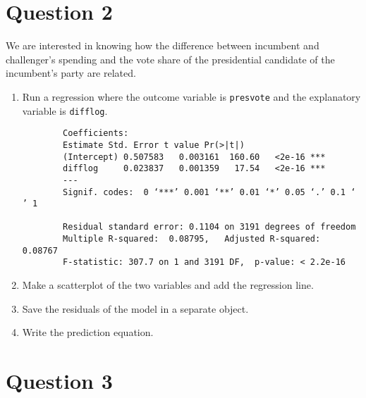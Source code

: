 \documentclass[12pt,letterpaper]{article}
\begin{document}
\section*{Question 2}
\noindent We are interested in knowing how the difference between incumbent and challenger's spending and the vote share of the presidential candidate of the incumbent's party are related.	\vspace{.25cm}
	\begin{enumerate}
		\item Run a regression where the outcome variable is \texttt{presvote} and the explanatory variable is \texttt{difflog}.	\vspace{1cm}
		
		\begin{verbatim}
		Coefficients:
		Estimate Std. Error t value Pr(>|t|)    
		(Intercept) 0.507583   0.003161  160.60   <2e-16 ***
		difflog     0.023837   0.001359   17.54   <2e-16 ***
		---
		Signif. codes:  0 ‘***’ 0.001 ‘**’ 0.01 ‘*’ 0.05 ‘.’ 0.1 ‘ ’ 1
		
		Residual standard error: 0.1104 on 3191 degrees of freedom
		Multiple R-squared:  0.08795,	Adjusted R-squared:  0.08767 
		F-statistic: 307.7 on 1 and 3191 DF,  p-value: < 2.2e-16
	\end{verbatim}
		
		\item Make a scatterplot of the two variables and add the regression line. 	\vspace{5cm}
		\item Save the residuals of the model in a separate object.	\vspace{5cm}
		\item Write the prediction equation.
	\end{enumerate}
	
	\newpage	
\section*{Question 3}
\end{document}
